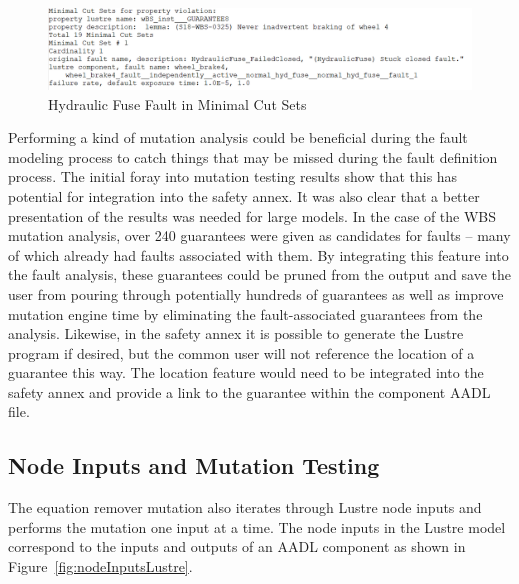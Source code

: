\begin{figure}[h]
	\begin{center}
		\includegraphics[scale=0.7]{images/cutSetsWheelBrake.PNG}
	\end{center}
	\caption{Hydraulic Fuse Fault in Minimal Cut Sets}
	\label{fig:cutSetsWheelBrake}
\end{figure}

Performing a kind of mutation analysis could be beneficial during the fault modeling process to catch things that may be missed during the fault definition process. The initial foray into mutation testing results show that this has potential for integration into the safety annex. It was also clear that a better presentation of the results was needed for large models. In the case of the WBS mutation analysis, over 240 guarantees were given as candidates for faults -- many of which already had faults associated with them. By integrating this feature into the fault analysis, these guarantees could be pruned from the output and save the user from pouring through potentially hundreds of guarantees as well as improve mutation engine time by eliminating the fault-associated guarantees from the analysis. Likewise, in the safety annex it is possible to generate the Lustre program if desired, but the common user will not reference the location of a guarantee this way. The location feature would need to be integrated into the safety annex and provide a link to the guarantee within the component AADL file.

\subsection{Node Inputs and Mutation Testing}
The equation remover mutation also iterates through Lustre node inputs and performs the mutation one input at a time. The node inputs in the Lustre model correspond to the inputs and outputs of an AADL component as shown in Figure~\ref{fig:nodeInputsLustre}. 

